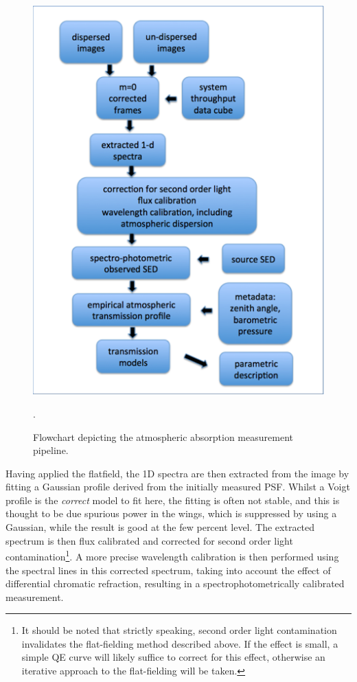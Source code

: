\begin{figure}
	\centering
	\includegraphics[width=\textwidth]{figures/aux_telescope_workflow.png}
	\caption{Flowchart depicting the atmospheric absorption measurement pipeline.}.
	\label{fig:aux_telescope}
\end{figure}

Having applied the flatfield, the 1D spectra are then extracted from the image by fitting a Gaussian profile derived from the initially measured PSF. Whilst a Voigt profile is the \emph{correct} model to fit here, the fitting is often not stable, and this is thought to be due spurious power in the wings, which is suppressed by using a Gaussian, while the result is good at the few percent level. The extracted spectrum is then flux calibrated and corrected for second order light contamination\footnote{ It should be noted that strictly speaking, second order light contamination invalidates the flat-fielding method described above. If the effect is small, a simple QE curve will likely suffice to correct for this effect, otherwise an iterative approach to the flat-fielding will be taken.}. A more precise wavelength calibration is then performed using the spectral lines in this corrected spectrum, taking into account the effect of differential chromatic refraction, resulting in a spectrophotometrically calibrated measurement.

